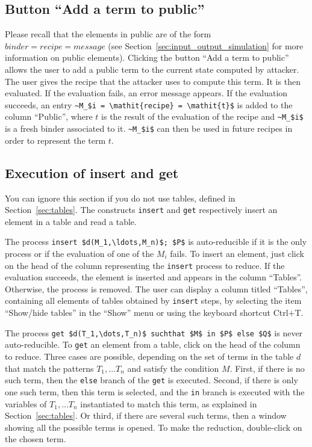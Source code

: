 \documentclass{book}
\begin{document}
\subsection{Button ``Add a term to public''}\label{sec:create_public_term}

Please recall that the elements in public are of the form $\mathit{binder} = \mathit{recipe} = \mathit{message}$ (see Section~\ref{sec:input_output_simulation} for more information on public elements).
Clicking the button ``Add a term to public'' allows the user to add a public term to the current state computed by attacker. The user gives the recipe that the attacker uses to compute this term. It is then evaluated. If the evaluation fails, an error message appears. If the evaluation succeeds, an entry \lstinline!~M_$i = \mathit{recipe} = \mathit{t}$! is added to the column ``Public'', where $t$ is the result of the evaluation of the recipe and \lstinline!~M_$i$! is a fresh binder associated to it. \lstinline!~M_$i$! can then be used in future recipes in order to represent the term $t$.

\subsection{Execution of insert and get}\label{sec:insert_get}

You can ignore this section if you do not use tables, defined in Section~\ref{sec:tables}.
The constructs \lstinline!insert! and \lstinline!get! respectively insert an element in a table
and read a table.

The process  \lstinline!insert $d(M_1,\ldots,M_n)$; $P$! is auto-reducible if it is the only process or if the evaluation of one of the $M_i$ fails.
To insert an element, just click on the head of the column representing the \lstinline!insert! process to reduce. If the evaluation succeeds, the element is inserted and appears in the column ``Tables''. Otherwise, the process is removed.
The user can display a column titled ``Tables'', containing all elements of tables obtained by \lstinline!insert! steps, by selecting the item ``Show/hide tables'' in the ``Show'' menu or using the keyboard shortcut Ctrl$+$T.

The process \lstinline!get $d(T_1,\dots,T_n)$ suchthat $M$ in $P$ else $Q$! is never auto-reducible.
To  \lstinline!get! an element from a table, click on the head of the column to reduce. Three cases are possible, depending on the set of terms in the table $d$ that match the patterns $T_1, \dots T_n$ and satisfy the condition $M$. First, if there is no such term, then the \lstinline!else! branch of the \lstinline!get! is executed. Second, if there is only one such term, then this term is selected, and the \lstinline!in! branch is executed with the variables of $T_1, \dots T_n$ instantiated to match this term, as explained in Section~\ref{sec:tables}. Or third, if there are several such terms, then a window showing all the possible terms is opened. To make the reduction, double-click on the chosen term.
\end{document}
